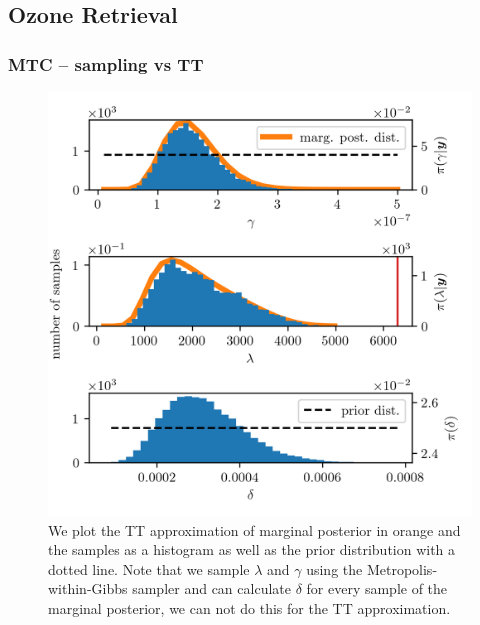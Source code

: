 \subsection{Ozone Retrieval}

\subsubsection{MTC --  sampling vs TT}
\begin{figure}[ht!]
	\centering
	\includegraphics{secSIRTMargMargO3Res.png}
	\caption[Marginal posterior histograms and TT approximation as well as hyper-prior distribution.]{We plot the TT approximation of marginal posterior in orange and the samples as a histogram as well as the prior distribution with a dotted line. Note that we sample $\lambda$ and $\gamma$ using the Metropolis-within-Gibbs sampler and can calculate $\delta$ for every sample of the marginal posterior, we can not do this for the TT approximation.}
	\label{fig:MargPostHistTT}
\end{figure}
